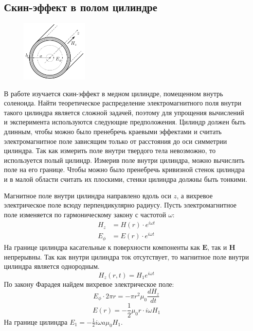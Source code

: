 \subsection*{Скин-эффект в полом цилиндре}

\begin{figure}
	\vspace{-10pt}
	\centering
	\includegraphics[width=0.3\textwidth]{../res/pipe.png}
	\caption{}
	\label{fig:pipe}
\end{figure}

В работе изучается скин-эффект в медном цилиндре, помещенном внутрь соленоида. Найти теоретическое распределение электромагнитного поля внутри такого цилиндра является сложной задачей, поэтому для упрощения вычислений и эксперимента используются следующие предположения. Цилиндр должен быть длинным, чтобы можно было пренебречь краевыми эффектами и считать электромагнитное поле зависящим только от расстояния до оси симметрии цилиндра. Так как измерить поле внутри твердого тела невозможно, то используется полый цилиндр. Измерив поле внутри цилиндра, можно вычислить поле на его границе. Чтобы можно было пренебречь кривизной стенок цилиндра и в малой области считать их плоскими, стенки цилиндра должны быть тонкими.

Магнитное поле внутри цилиндра направлено вдоль оси $z$, а вихревое электрическое поле всюду перпендикулярно радиусу. Пусть электромагнитное поле изменяется по гармоническому закону с частотой $\omega$:
\begin{equation*}
	\begin{split}
		H_z &= H(r) \cdot e^{i\omega t} \\
		E_{\phi} &= E(r) \cdot e^{i \omega t}
	\end{split}
\end{equation*}
На границе цилиндра касательные к поверхности компоненты как $\pmb{E}$, так и $\pmb{H}$ непрерывны. Так как внутри цилиндра ток отсутствует, то магнитное поле внутри цилиндра является однородным.
$$
H_z(r, t) = H_1 e^{i \omega t}
$$
По закону Фарадея найдем вихревое электрическое поле:
$$
E_{\phi} \cdot 2\pi r = - \pi r^2 \mu_0 \frac{d H_z}{dt} 
$$
$$
E(r) = -\frac{1}{2} \mu_0 r \cdot i\omega H_1
$$
На границе цилиндра $E_1 = -\frac{1}{2} i \omega a \mu_0 H_1$.

